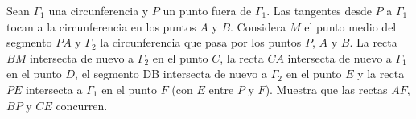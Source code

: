 Sean $\Gamma_1$ una circunferencia y $P$ un punto fuera de $\Gamma_1$. Las tangentes desde $P$ a $\Gamma_1$ tocan a la circunferencia en los puntos $A$ y $B$. Considera $M$ el punto medio del segmento $PA$ y $\Gamma_2$ la circunferencia que pasa por los puntos $P$, $A$ y $B$. La recta $BM$ intersecta de nuevo a $\Gamma_2$ en el punto $C$, la recta $CA$ intersecta de nuevo a $\Gamma_1$ en el punto $D$, el segmento DB intersecta de nuevo a $\Gamma_2$ en el punto $E$ y la recta $PE$ intersecta a $\Gamma_1$ en el punto $F$ (con $E$ entre $P$ y $F$). Muestra que las rectas $AF$, $BP$ y $CE$ concurren.